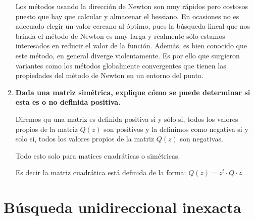 \documentclass[12pt]{article}
\begin{document}
\begin{enumerate}
    Los métodos usando la dirección de Newton son muy rápidos pero costosos puesto que hay que calcular y almacenar el hessiano. En ocasiones no es adecuado elegir un valor cercano al óptimo, pues la búsqueda lineal que nos brinda el método de Newton es muy larga y realmente sólo estamos interesados en reducir el valor de la función. Además, es bien conocido que este método, en general diverge violentamente. Es por ello que surgieron variantes como los métodos globalmente convergentes que tienen las propiedades del método de Newton en un entorno del punto.
    \item \textbf{Dada una matriz simétrica, explique cómo se puede determinar si esta es o no definida positiva.}
    
    Diremos qu una matriz es definida positiva  si y sólo si, todos los valores propios de la matriz $Q(z)$ son positivos y la definimos como negativa si y solo si, todos los valores propios de la matriz $Q(z)$ son negativas.
		
		Todo esto solo para matices cuadráticas o simétricas.
		
		Es decir la matriz cuadrática está definida de la forma: $Q(z)= z^t \cdot Q \cdot z$
\end{enumerate}


\section*{Búsqueda unidireccional inexacta}
\end{document}
